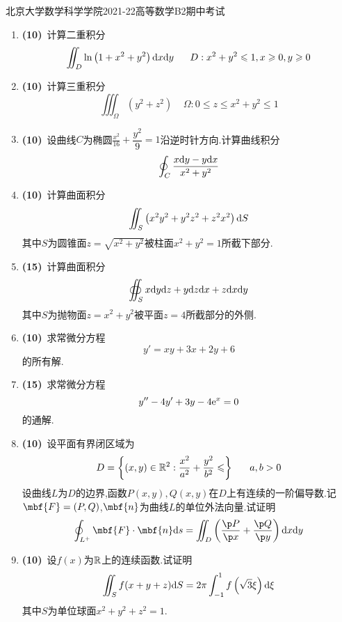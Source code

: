 \documentclass{ctexart}
\begin{document}
\pagestyle{empty}
\begin{center}\Large
    北京大学数学科学学院2021-22高等数学B2期中考试
\end{center}
\begin{enumerate}[leftmargin=*,label=\textbf{\arabic*.}]
    \item \textbf{(10)}\ 计算二重积分
        \[\iint_{D}\ln\left(1+x^2+y^2\right)\dx\di y\ \ \ \ \ D:x^2+y^2\leqslant1,x\geqslant0,y\geqslant0\]
    \item \textbf{(10)}\ 计算三重积分
        \[\iiint_{\Omega}\left(y^2+z^2\right)\ \ \ \ \ \Omega:0\leqslant z\leqslant x^2+y^2\leqslant1\]
    \item \textbf{(10)}\ 设曲线$C$为椭圆$\frac{x^2}{16}+\dfrac{y^2}{9}=1$沿逆时针方向.计算曲线积分
        \[\oint_{C}\dfrac{x\mathrm{d} y-y\mathrm{d} x}{x^2+y^2}\]
    \item \textbf{(10)}\ 计算曲面积分
        \[\iint_{S}\left(x^2y^2+y^2z^2+z^2x^2\right)\mathrm{d} S\]
        其中$S$为圆锥面$z=\sqrt{x^2+y^2}$被柱面$x^2+y^2=1$所截下部分.
    \item \textbf{(15)}\ 计算曲面积分
        \[\oiint_Sx\mathrm{d} y\mathrm{d} z+y\mathrm{d} z\mathrm{d} x+z\mathrm{d} x\mathrm{d} y\]
        其中$S$为抛物面$z=x^2+y^2$被平面$z=4$所截部分的外侧.
    \item \textbf{(10)}\ 求常微分方程
        \[y'=xy+3x+2y+6\]
        的所有解.
    \item \textbf{(15)}\ 求常微分方程
        \[y''-4y'+3y-4\mathrm{e}^x=0\]
        的通解.
    \item \textbf{(10)}\ 设平面有界闭区域为
        \[D=\left\{(x,y)\in\R^2:\dfrac{x^2}{a^2}+\dfrac{y^2}{b^2}\leqslant\right\}\ \ \ \ \ a,b>0\]
        设曲线$L$为$D$的边界,函数$P(x,y),Q(x,y)$在$D$上有连续的一阶偏导数.记$\mbf{F}=(P,Q)$,$\mbf{n}$为曲线$L$的单位外法向量.试证明
        \[\oint_{L^+}\mbf{F}\cdot\mbf{n}\di s=\iint_{D}\left(\dfrac{\p P}{\p x}+\dfrac{\p Q}{\p y}\right)\di x\di y\]
    \item \textbf{(10)}\ 设$f(x)$为$\mathbb{R}$上的连续函数.试证明
        \[\iint_{S}f(x+y+z)\mathrm{d} S=2\pi\int_{-1}^{1}f\left(\sqrt{3}\xi\right)\mathrm{d}\xi\]
        其中$S$为单位球面$x^2+y^2+z^2=1$.
\end{enumerate}
\end{document}
